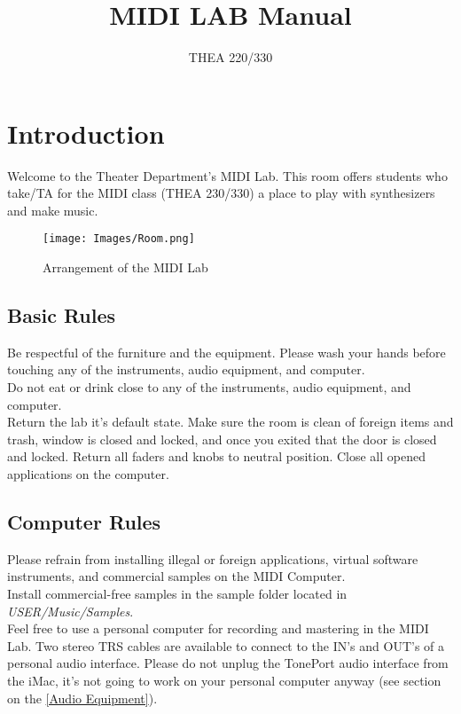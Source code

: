 \documentclass[12pt]{article}
\title{MIDI LAB Manual}
\author{THEA 220/330}
\date{}
\begin{document}


\tableofcontents

\listoffigures

\newpage
\section{Introduction}

Welcome to the  Theater Department's MIDI Lab. This room offers students who take/TA for the MIDI class (THEA 230/330) a place to play with synthesizers and make music. \\


\begin{figure}[h]
\centering
\texttt{[image: Images/Room.png]}
\caption{Arrangement of the MIDI Lab}
\label{fig:fullfig}
\end{figure}

\subsection{Basic Rules}

Be respectful of the furniture and the equipment. Please wash your hands before touching any of the instruments, audio equipment, and computer.\\
\linebreak
Do not eat or drink close to any of the instruments, audio equipment, and computer.\\
\linebreak
Return the lab it's default state. Make sure the room is clean of foreign items and trash, window is closed and locked, and once you exited that the door is closed and locked. Return all faders and knobs to neutral position. Close all opened applications on the computer.

\subsection{Computer Rules}

Please refrain from installing illegal or foreign applications, virtual software instruments, and commercial samples on the MIDI Computer.\\
\linebreak
Install commercial-free samples in the sample folder located in \emph{USER/Music/Samples}.\\
\linebreak
Feel free to use a personal computer for recording and mastering in the MIDI Lab. Two stereo TRS cables are available to connect to the IN's and OUT's of a personal audio interface. Please do not unplug the TonePort audio interface from the iMac, it's not going to work on your personal computer anyway (see section on the \ref{Audio Equipment}). 

\newpage

\newpage

\newpage


\newpage

\end{document}
